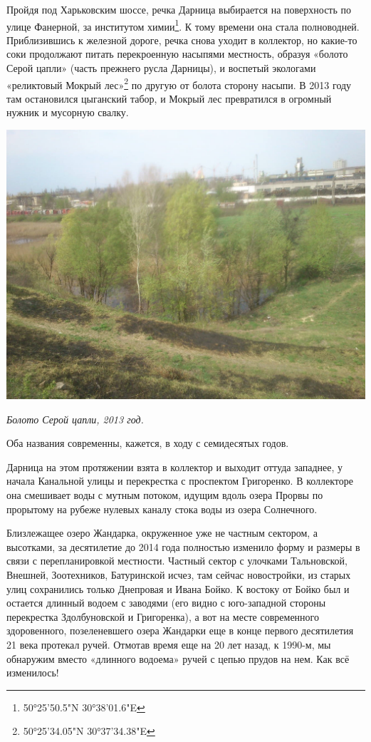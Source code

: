 Пройдя под Харьковским шоссе, речка Дарница выбирается на поверхность по улице Фанерной, за институтом химии\footnote{50°25'50.5"N 30°38'01.6"E}. К тому времени она стала полноводней. Приблизившись к железной дороге, речка снова уходит в коллектор, но какие-то соки продолжают питать перекроенную насыпями местность, образуя «болото Серой цапли» (часть прежнего русла Дарницы), и воспетый экологами «реликтовый Мокрый лес»\footnote{50°25'34.05"N 30°37'34.38"E} по другую от болота сторону насыпи. В 2013 году там остановился цыганский табор, и Мокрый лес превратился в огромный нужник и мусорную свалку.

\begin{center}
\includegraphics[width=\linewidth]{chast-gorodki/darn/s_darnica-DSC_0026.JPG}

\textit{Болото Серой цапли, 2013 год.}
\end{center}

Оба названия современны, кажется, в ходу с семидесятых годов.

Дарница на этом протяжении взята в коллектор и выходит оттуда западнее, у начала Канальной улицы и перекрестка с проспектом Григоренко. В коллекторе она смешивает воды с мутным потоком, идущим вдоль озера Прорвы по прорытому на рубеже нулевых каналу стока воды из озера Солнечного.

Близлежащее озеро Жандарка, окруженное уже не частным сектором, а высотками, за десятилетие до 2014 года полностью изменило форму и размеры в связи с перепланировкой местности. Частный сектор с улочками Тальновской, Внешней, Зоотехников, Батуринской исчез, там сейчас новостройки, из старых улиц сохранились только Днепровая и Ивана Бойко. К востоку от Бойко был и остается длинный водоем с заводями (его видно с юго-западной стороны перекрестка Здолбуновской и Григоренка), а вот на месте современного здоровенного, позеленевшего озера Жандарки еще в конце первого десятилетия 21 века протекал ручей. Отмотав время еще на 20 лет назад, к 1990-м, мы обнаружим вместо «длинного водоема» ручей с цепью прудов на нем. Как всё изменилось!

